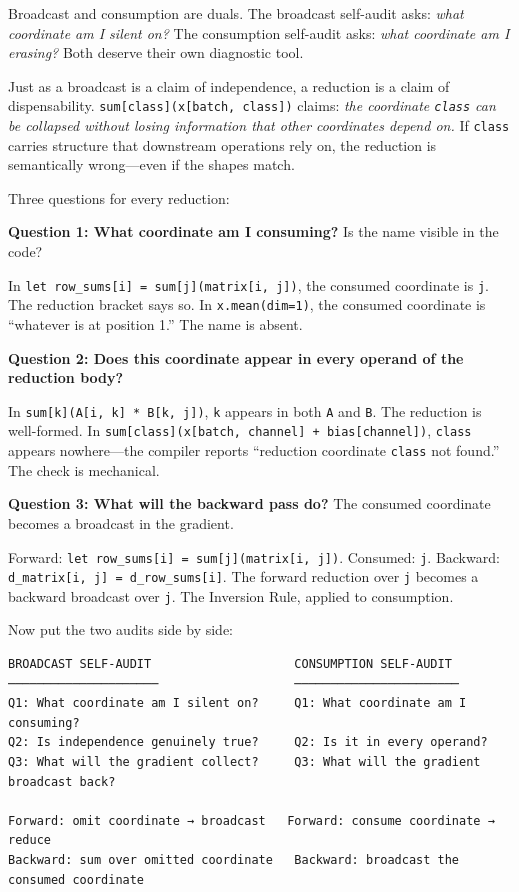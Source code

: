 \documentclass[11pt,titlepage]{article}
\begin{document}
Broadcast and consumption are duals. The broadcast self-audit asks:
\emph{what coordinate am I silent on?} The consumption self-audit asks:
\emph{what coordinate am I erasing?} Both deserve their own diagnostic
tool.

Just as a broadcast is a claim of independence, a reduction is a claim
of dispensability. \texttt{sum{[}class{]}(x{[}batch,\ class{]})} claims:
\emph{the coordinate \texttt{class} can be collapsed without losing
information that other coordinates depend on.} If \texttt{class} carries
structure that downstream operations rely on, the reduction is
semantically wrong---even if the shapes match.

Three questions for every reduction:

\textbf{Question 1: What coordinate am I consuming?} Is the name visible
in the code?

In \texttt{let\ row\_sums{[}i{]}\ =\ sum{[}j{]}(matrix{[}i,\ j{]})}, the
consumed coordinate is \texttt{j}. The reduction bracket says so. In
\texttt{x.mean(dim=1)}, the consumed coordinate is ``whatever is at
position 1.'' The name is absent.

\textbf{Question 2: Does this coordinate appear in every operand of the
reduction body?}

In \texttt{sum{[}k{]}(A{[}i,\ k{]}\ *\ B{[}k,\ j{]})}, \texttt{k}
appears in both \texttt{A} and \texttt{B}. The reduction is well-formed.
In
\texttt{sum{[}class{]}(x{[}batch,\ channel{]}\ +\ bias{[}channel{]})},
\texttt{class} appears nowhere---the compiler reports ``reduction
coordinate \texttt{class} not found.'' The check is mechanical.

\textbf{Question 3: What will the backward pass do?} The consumed
coordinate becomes a broadcast in the gradient.

Forward:
\texttt{let\ row\_sums{[}i{]}\ =\ sum{[}j{]}(matrix{[}i,\ j{]})}.
Consumed: \texttt{j}. Backward:
\texttt{d\_matrix{[}i,\ j{]}\ =\ d\_row\_sums{[}i{]}}. The forward
reduction over \texttt{j} becomes a backward broadcast over \texttt{j}.
The Inversion Rule, applied to consumption.

Now put the two audits side by side:

\begin{verbatim}
BROADCAST SELF-AUDIT                    CONSUMPTION SELF-AUDIT
─────────────────────                   ───────────────────────
Q1: What coordinate am I silent on?     Q1: What coordinate am I consuming?
Q2: Is independence genuinely true?     Q2: Is it in every operand?
Q3: What will the gradient collect?     Q3: What will the gradient broadcast back?

Forward: omit coordinate → broadcast   Forward: consume coordinate → reduce
Backward: sum over omitted coordinate   Backward: broadcast the consumed coordinate
\end{verbatim}
\end{document}
